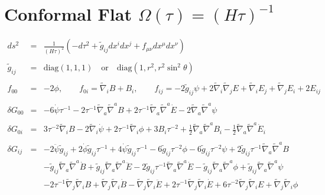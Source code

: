 \documentclass[10pt,letterpaper]{article}
\numberwithin{equation}{section}
\begin{document}
\section{Conformal Flat $\Omega(\tau)=(H\tau)^{-1}$}
%
\begin{eqnarray}
ds^2 &=& \frac{1}{(H\tau)^2}(-d\tau^2 + \tilde g_{ij} dx^i dx^j + f_{\mu\nu} dx^\mu dx^\nu)
\\ \nonumber\\
\tilde g_{ij} &=& \text{diag}(1,1,1)\quad\text{or}\quad \text{diag}(1,r^2,r^2\sin^2\theta)
\\ \nonumber\\
f_{00} &=& -2\phi,\qquad f_{0i}= \tilde \nabla_i B + B_i,\qquad 
f_{ij} = -2 \tilde g_{ij}\psi + 2\tilde\nabla_i\tilde \nabla_j E + \tilde \nabla_i E_j + \tilde \nabla_j E_i + 2E_{ij}
\\ \nonumber\\
\delta G_{00} &=& -6 \dot{\psi} \tau^{-1}
- 2 \tau^{-1} \tilde{\nabla}_{a}\tilde{\nabla}^{a}B
+ 2 \tau^{-1} \tilde{\nabla}_{a}\tilde{\nabla}^{a}\dot{E}
- 2 \tilde{\nabla}_{a}\tilde{\nabla}^{a}\psi
\\ \nonumber\\
\delta G_{0i} &=&3 \tau^{-2} \tilde{\nabla}_{i}B
- 2 \tilde{\nabla}_{i}\dot{\psi}
+ 2 \tau^{-1} \tilde{\nabla}_{i}\phi
+3 B_{i} \tau^{-2}
+ \tfrac{1}{2} \tilde{\nabla}_{a}\tilde{\nabla}^{a}B_{i}
-  \tfrac{1}{2} \tilde{\nabla}_{a}\tilde{\nabla}^{a}\dot{E}_{i}
\\ \nonumber\\
\delta G_{ij}&=&-2 \ddot{\psi} \tilde{g}_{ij}
+ 2 \dot{\phi} \tilde{g}_{ij} \tau^{-1}
+ 4 \dot{\psi} \tilde{g}_{ij} \tau^{-1}
- 6 \tilde{g}_{ij} \tau^{-2} \phi
- 6 \tilde{g}_{ij} \tau^{-2} \psi
+ 2 \tilde{g}_{ij} \tau^{-1} \tilde{\nabla}_{a}\tilde{\nabla}^{a}B\nonumber\\
&& -  \tilde{g}_{ij} \tilde{\nabla}_{a}\tilde{\nabla}^{a}\dot{B}
+ \tilde{g}_{ij} \tilde{\nabla}_{a}\tilde{\nabla}^{a}\ddot{E}
- 2 \tilde{g}_{ij} \tau^{-1} \tilde{\nabla}_{a}\tilde{\nabla}^{a}\dot{E}
-  \tilde{g}_{ij} \tilde{\nabla}_{a}\tilde{\nabla}^{a}\phi
+ \tilde{g}_{ij} \tilde{\nabla}_{a}\tilde{\nabla}^{a}\psi\nonumber\\
&& - 2 \tau^{-1} \tilde{\nabla}_{j}\tilde{\nabla}_{i}B
+ \tilde{\nabla}_{j}\tilde{\nabla}_{i}\dot{B}
-  \tilde{\nabla}_{j}\tilde{\nabla}_{i}\ddot{E}
+ 2 \tau^{-1} \tilde{\nabla}_{j}\tilde{\nabla}_{i}\dot{E}
+ 6 \tau^{-2} \tilde{\nabla}_{j}\tilde{\nabla}_{i}E
+ \tilde{\nabla}_{j}\tilde{\nabla}_{i}\phi

\end{eqnarray}
\end{document}
